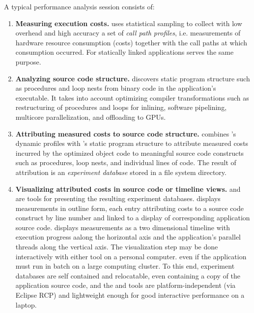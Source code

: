 \documentclass[english]{article}
\begin{document}
A typical performance analysis session consists of:
\begin{enumerate}
\item \textbf{Measuring execution costs.}  
 uses statistical sampling to collect with low overhead and high accuracy
a set of \emph{call path profiles},
i.e. measurements of hardware resource consumption (costs) together with the call paths at which consumption occurred.
For statically linked applications  serves the same purpose.

\item \textbf{Analyzing source code structure.} 
 discovers static program structure such as procedures and loop nests
from binary code in the application's executable.
It takes into account optimizing compiler transformations such as restructuring of procedures and loops
for inlining, software pipelining, multicore parallelization, and offloading to GPUs.

\item \textbf{Attributing measured costs to source code structure.} 
 combines 's dynamic profiles
with 's static program structure
to attribute measured costs incurred by the optimized object code
to meaningful source code constructs such as procedures, loop nests, and individual lines of code.
The result of attribution is an \emph{experiment database} stored in a file system directory.

\item \textbf{Visualizing attributed costs in source code or timeline views.}
 and 
are tools for presenting the resulting experiment databases.
 displays measurements in outline form,
each entry attributing costs to a source code construct by line number
and linked to a display of corresponding application source code.
 displays measurements as a two dimensional timeline
with execution progress aalong the horizontal axis
and the application's parallel threads along the vertical axis.
The visualization step may be done  interactively with either tool on a personal computer.
even if the application must run in batch on a large computing cluster.
To this end, experiment databases are self contained and relocatable,
even containing a copy of the application source code,
and the  and  tools
are platform-independent (via Eclipse RCP)
and lightweight enough for good interactive performance on a laptop.

\end{enumerate}
\end{document}
